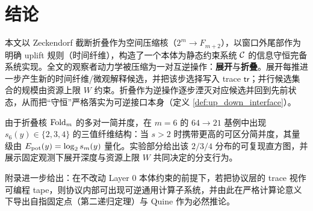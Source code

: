 \section{结论}

本文以 Zeckendorf 截断折叠作为空间压缩核（\(2^m\to F_{m+2}\)），以窗口外尾部作为明确 uplift 规则（时间纤维），构造了一个本体为静态约束系统 \(\mathcal{C}\) 的信息守恒完备系统实现。全文的观察者动力学被压缩为一对互逆操作：\textbf{展开}与\textbf{折叠}。展开每推进一步产生新的时间纤维/微观解释候选，并把该步选择写入 trace \(\mathsf{tr}\)；并行候选集合的规模由资源上限 \(W\) 约束。折叠作为逆操作逐步湮灭对应候选并回到先前状态，从而把“守恒”严格落实为可逆接口本身（定义 \ref{def:up_down_interface}）。

由于折叠核 \(\mathrm{Fold}_m\) 的多对一简并度，在 \(m=6\) 的 \(64\to 21\) 基例中出现 \(s_6(y)\in\{2,3,4\}\) 的三值纤维结构：当 \(s>2\) 时携带更高的可区分简并度，其量级由 \(E_{\mathrm{pot}}(y)=\log_2 s_m(y)\) 量化。实验部分给出该 \(2/3/4\) 分布的可复现直方图，并展示固定观测下展开深度与资源上限 \(W\) 共同决定的分支行为。

附录进一步给出：在不改动 Layer 0 本体约束的前提下，若把协议层的 trace 视作可编程 tape，则协议内部可出现可逆通用计算子系统，并由此在严格计算论意义下导出自指固定点（第二递归定理）与 Quine 作为必然推论。
